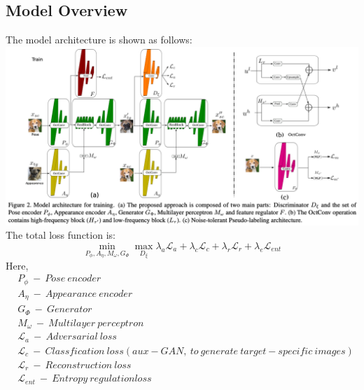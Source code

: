 \documentclass[10pt]{article}
\begin{document}
        \subsection*{Model Overview}
            The model architecture is shown as follows: \\
            \includegraphics[width=\linewidth]{src/img/Model Architecture.png} \\
            The total loss function is: \\
            $$
                \min_{P_{\phi}, A_{\eta}, M_{\omega}, G_{\Phi}} 
                \max_{D_{\xi}} 
                \lambda_a \mathcal{L}_a + 
                \lambda_c \mathcal{L}_c + 
                \lambda_r \mathcal{L}_r + 
                \lambda_e \mathcal{L}_{ent} 
            $$
            Here, 
            \begin{equation}
                \begin{aligned}
                    & P_{\phi} \ -\  Pose\ encoder \\
                    & A_{\eta} \ -\  Appearance\ encoder \\
                    & G_{\Phi} \ -\  Generator \\
                    & M_{\omega} \ -\  Multilayer\ perceptron \\
                    & \mathcal{L}_a \ -\  Adversarial\ loss \\
                    & \mathcal{L}_c \ -\  Classfication\ loss (aux-GAN,\ to\ generate\ target-specific\ images) \\
                    & \mathcal{L}_r \ -\  Reconstruction\ loss \\
                    & \mathcal{L}_{ent} \ -\  Entropy\ regulation loss
                \end{aligned}
            \end{equation}
        
\end{document}
